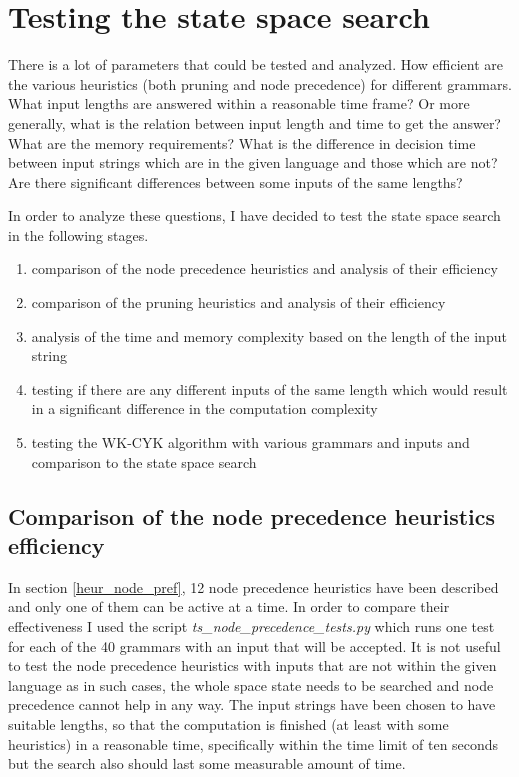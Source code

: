 \section{Testing the state space search}

There is a lot of parameters that could be tested and analyzed. How efficient are the various heuristics (both pruning and node precedence) for different grammars. What input lengths are answered within a reasonable time frame? Or more generally, what is the relation between input length and time to get the answer? What are the memory requirements? What is the difference in decision time between input strings which are in the given language and those which are not? Are there significant differences between some inputs of the same lengths?

In order to analyze these questions, I have decided to test the state space search in the following stages.
\begin{enumerate}
  \item{comparison of the node precedence heuristics and analysis of their efficiency}
  \item{comparison of the pruning heuristics and analysis of their efficiency}
  \item{analysis of the time and memory complexity based on the length of the input string}
  \item{testing if there are any different inputs of the same length which would result in a significant difference in the computation complexity}
  \item{testing the WK-CYK algorithm with various grammars and inputs and comparison to the state space search}
\end{enumerate}

\subsection{Comparison of the node precedence heuristics efficiency} \label{section:node_prec_test}
In section \ref{heur_node_pref}, 12 node precedence heuristics have been described and only one of them can be active at a time.
In order to compare their effectiveness I used the script \textit{ts\_node\_prece\-dence\_tests.py} which runs one test for each of the 40 grammars with an input that will be accepted. It is not useful to test the node precedence heuristics with inputs that are not within the given language as in such cases, the whole space state needs to be searched and node precedence cannot help in any way. The input strings have been chosen to have suitable lengths, so that the computation is finished (at least with some heuristics) in a reasonable time, specifically within the time limit of ten seconds but the search also should last some measurable amount of time.

